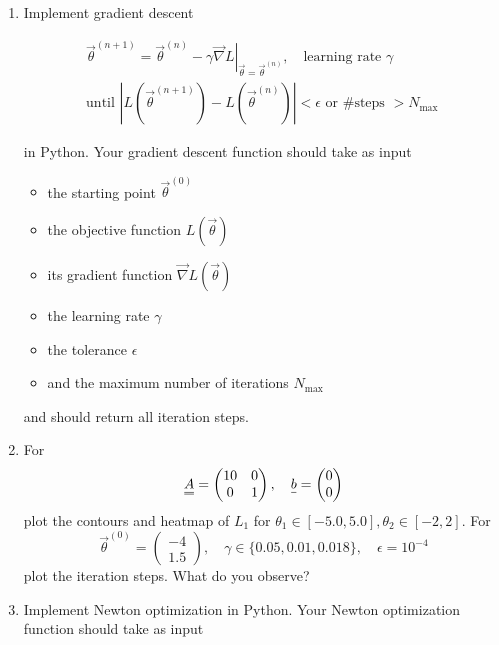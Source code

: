     \begin{enumerate}
        \item Implement gradient descent
        
        \begin{equation}
            \begin{gathered}
                \vec{\theta}^{(n+1)}=\vec{\theta}^{(n)}-\left.\gamma \vec{\nabla} L\right|_{\vec{\theta}=\vec{\theta}^{(n)}}, \quad \text{learning rate } \gamma \\
                \text{until } \left|L\left(\vec{\theta}^{(n+1)}\right)-L\left(\vec{\theta}^{(n)}\right)\right|<\epsilon \text{ or \# steps } >N_{\text {max }}
            \end{gathered}
        \end{equation}
        
        in Python. Your gradient descent function should take as
        input

        \begin{itemize}
            \item the starting point $\vec{\theta}^{(0)}$
            \item the objective function $L(\vec{\theta})$
            \item its gradient function $\vec{\nabla} L(\vec{\theta})$
            \item the learning rate $\gamma$
            \item the tolerance $\epsilon$
            \item and the maximum number of iterations $N_{\text{max}}$
        \end{itemize}

        and should return all iteration steps.

        \item For
        \begin{equation}
            \mat{A} = \begin{pmatrix}
                10 & 0 \\
                0 & 1
            \end{pmatrix}, \quad \vec{b} = \begin{pmatrix}
                0 \\
                0
            \end{pmatrix}
        \end{equation}
        plot the contours and heatmap of $L_1$ for $\theta_1 \in [-5.0,5.0], \theta_2 \in [-2,2]$.
        For \begin{equation}
            \vec{\theta}^{(0)} = \begin{pmatrix}
            -4 \\ 1.5
        \end{pmatrix}, \quad \gamma \in \{0.05, 0.01, 0.018\}, \quad \epsilon = 10^{-4}
        \end{equation}
        plot the iteration steps. What do you observe?
        \item Implement Newton optimization in Python. Your Newton optimization function should take as
        input


\end{enumerate}
